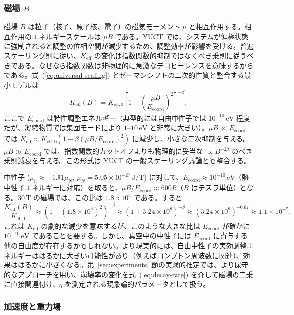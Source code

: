 \documentclass[12pt]{article}
\newcommand{\Keff}{K_{\mathrm{eff}}}
\newcommand{\Keffzero}{K_{\mathrm{eff},0}}
\theoremstyle{remark}
\begin{document}
	\subsubsection{磁場 \(B\)}
	
	磁場 \(B\) は粒子（核子、原子核、電子）の磁気モーメント \(\mu\) と相互作用する。相互作用のエネルギースケールは \(\mu B\) である。YUCT では、システムが偏極状態に強制されると調整の位相空間が減少するため、調整効率が影響を受ける。普遍スケーリング則に従い、\(\Keff\) の変化は指数関数的抑制ではなくべき乗則に従うべきである。なぜなら指数関数は非物理的に急激なデコヒーレンスを意味するからである。式~(\ref{eq:universal-scaling}) とゼーマンシフトの二次的性質と整合する最小モデルは
	\begin{equation}
		\Keff(B) = \Keffzero \left[ 1 + \left( \frac{\mu B}{E_{\mathrm{coord}}} \right)^2 \right]^{-\beta},
		\label{eq:keff-B}
	\end{equation}
	ここで \(E_{\mathrm{coord}}\) は特性調整エネルギー（典型的には自由中性子では \(10^{-10}\,\text{eV}\) 程度だが、凝縮物質では集団モードにより \(1\)–\(10\,\text{eV}\) と非常に大きい）。\(\mu B \ll E_{\mathrm{coord}}\) では \(\Keff \approx \Keffzero (1 - \beta (\mu B/E_{\mathrm{coord}})^2)\) に減少し、小さな二次抑制を与える。\(\mu B \gg E_{\mathrm{coord}}\) では、指数関数的カットオフよりも物理的に妥当な \(\propto B^{-2\beta}\) のべき乗則減衰を与える。この形式は YUCT の一般スケーリング議論とも整合する。
	
	中性子 (\(\mu_n \approx -1.91\mu_N\), \(\mu_N = 5.05\times 10^{-27}\,\text{J/T}\)) に対して、\(E_{\mathrm{coord}} \approx 10^{-10}\,\text{eV}\)（熱中性子エネルギーに対応）を取ると、\(\mu B / E_{\mathrm{coord}} \approx 600 B\)（\(B\) はテスラ単位）となる。\(30\,\text{T}\) の磁場では、この比は \(1.8\times10^4\) である。すると
	\[
	\frac{\Keff(B)}{\Keffzero} \approx (1 + (1.8\times10^4)^2)^{-\beta} \approx (1 + 3.24\times10^8)^{-\beta} \approx (3.24\times10^8)^{-0.67} \approx 1.1\times10^{-5}.
	\]
	これは \(\Keff\) の劇的な減少を意味するが、このような大きな比は \(E_{\mathrm{coord}}\) が確かに \(10^{-10}\,\text{eV}\) であることを要する。しかし、真空中の中性子には \(E_{\mathrm{coord}}\) に寄与する他の自由度が存在するかもしれない。より現実的には、自由中性子の実効調整エネルギーははるかに大きい可能性があり（例えばコンプトン周波数に関連）、効果ははるかに小さくなる。第~\ref{sec:experiments} 節の実験的推定では、より保守的なアプローチを用い、崩壊率の変化を式~(\ref{eq:decay-rate}) を介して磁場の二乗に直接関連付け、\(\eta\) を測定される現象論的パラメータとして扱う。
	
	\subsubsection{加速度と重力場}
	
\end{document}
